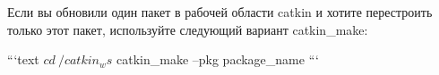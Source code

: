 

Если вы обновили один пакет в рабочей области catkin и хотите перестроить только этот пакет, используйте следующий вариант catkin\_make:

```text
$ cd ~/catkin_ws
$ catkin_make --pkg package_name
```

